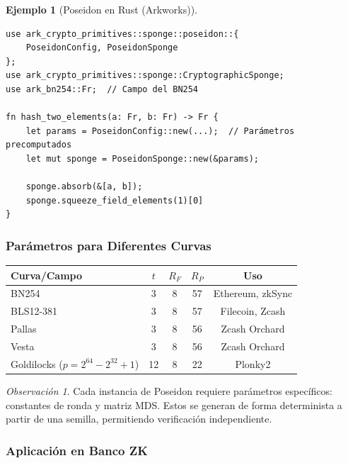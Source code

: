 \documentclass[11pt,a4paper,twoside,openright]{book}
\theoremstyle{definition}
\newtheorem{example}{Ejemplo}[chapter]
\theoremstyle{plain}
\theoremstyle{remark}
\newtheorem{remark}{Observación}[chapter]
\begin{document}
\begin{example}[Poseidon en Rust (Arkworks)]
\begin{verbatim}
use ark_crypto_primitives::sponge::poseidon::{
    PoseidonConfig, PoseidonSponge
};
use ark_crypto_primitives::sponge::CryptographicSponge;
use ark_bn254::Fr;  // Campo del BN254

fn hash_two_elements(a: Fr, b: Fr) -> Fr {
    let params = PoseidonConfig::new(...);  // Parámetros precomputados
    let mut sponge = PoseidonSponge::new(&params);
    
    sponge.absorb(&[a, b]);
    sponge.squeeze_field_elements(1)[0]
}
\end{verbatim}
\end{example}

\subsubsection{Parámetros para Diferentes Curvas}

\begin{center}
\begin{tabular}{lcccc}
\toprule
\textbf{Curva/Campo} & \textbf{$t$} & \textbf{$R_F$} & \textbf{$R_P$} & \textbf{Uso} \\
\midrule
BN254 & 3 & 8 & 57 & Ethereum, zkSync \\
BLS12-381 & 3 & 8 & 57 & Filecoin, Zcash \\
Pallas & 3 & 8 & 56 & Zcash Orchard \\
Vesta & 3 & 8 & 56 & Zcash Orchard \\
Goldilocks ($p = 2^{64} - 2^{32} + 1$) & 12 & 8 & 22 & Plonky2 \\
\bottomrule
\end{tabular}
\end{center}

\begin{remark}
Cada instancia de Poseidon requiere parámetros específicos: constantes de ronda y matriz MDS. Estos se generan de forma determinista a partir de una semilla, permitiendo verificación independiente.
\end{remark}

\subsubsection{Aplicación en Banco ZK}
\end{document}
